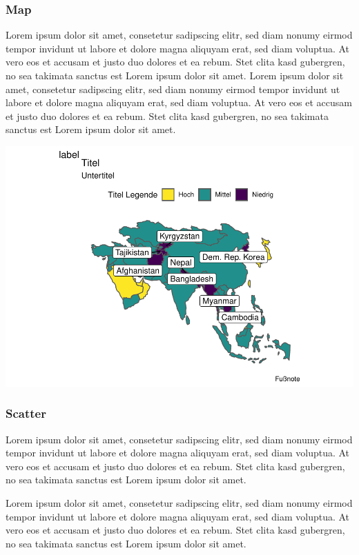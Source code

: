 \documentclass[
  twocolumn]{article}
\begin{document}
\hypertarget{map}{%
\subsubsection{Map}\label{map}}

Lorem ipsum dolor sit amet, consetetur sadipscing elitr, sed diam nonumy
eirmod tempor invidunt ut labore et dolore magna aliquyam erat, sed diam
voluptua. At vero eos et accusam et justo duo dolores et ea rebum. Stet
clita kasd gubergren, no sea takimata sanctus est Lorem ipsum dolor sit
amet. Lorem ipsum dolor sit amet, consetetur sadipscing elitr, sed diam
nonumy eirmod tempor invidunt ut labore et dolore magna aliquyam erat,
sed diam voluptua. At vero eos et accusam et justo duo dolores et ea
rebum. Stet clita kasd gubergren, no sea takimata sanctus est Lorem
ipsum dolor sit amet.

\includegraphics{PDFoutputsamples_files/figure-latex/unnamed-chunk-3-1.pdf}

\newpage

\twocolumn

\hypertarget{scatter}{%
\subsubsection{Scatter}\label{scatter}}

Lorem ipsum dolor sit amet, consetetur sadipscing elitr, sed diam nonumy
eirmod tempor invidunt ut labore et dolore magna aliquyam erat, sed diam
voluptua. At vero eos et accusam et justo duo dolores et ea rebum. Stet
clita kasd gubergren, no sea takimata sanctus est Lorem ipsum dolor sit
amet.

Lorem ipsum dolor sit amet, consetetur sadipscing elitr, sed diam nonumy
eirmod tempor invidunt ut labore et dolore magna aliquyam erat, sed diam
voluptua. At vero eos et accusam et justo duo dolores et ea rebum. Stet
clita kasd gubergren, no sea takimata sanctus est Lorem ipsum dolor sit
amet.
\end{document}

